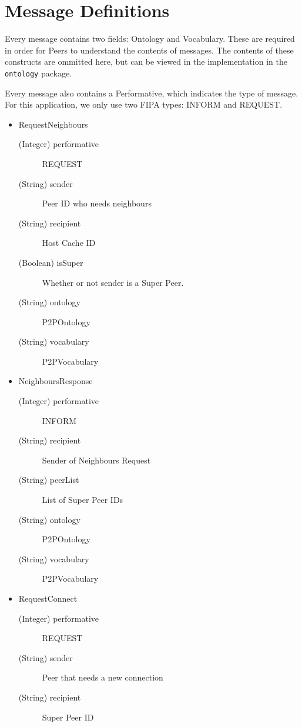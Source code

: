 \section{Message Definitions}

Every message contains two fields: Ontology and Vocabulary. These are required
in order for Peers to understand the contents of messages. The contents of
these constructs are ommitted here, but can be viewed in the implementation in
the \verb!ontology! package.


Every message also contains a Performative, which indicates the type of
message. For this application, we only use two FIPA types: INFORM and REQUEST.

\begin{multicols}{2}

\begin{itemize}
  \item{RequestNeighbours}
    \begin{description}
      \item[(Integer) performative] REQUEST
      \item[(String) sender] Peer ID who needs neighbours
      \item[(String) recipient] Host Cache ID
      \item[(Boolean) isSuper] Whether or not sender is a Super Peer.
      \item[(String) ontology] P2POntology
      \item[(String) vocabulary] P2PVocabulary
    \end{description}
  \item{NeighboursResponse}
    \begin{description}
      \item[(Integer) performative] INFORM
      \item[(String) recipient] Sender of Neighbours Request
      \item[(String) peerList] List of Super Peer IDs
      \item[(String) ontology] P2POntology
      \item[(String) vocabulary] P2PVocabulary
    \end{description}
  \item{RequestConnect}
    \begin{description}
      \item[(Integer) performative] REQUEST
      \item[(String) sender] Peer that needs a new connection
      \item[(String) recipient] Super Peer ID

\end{description}
\end{itemize}
\end{multicols}
